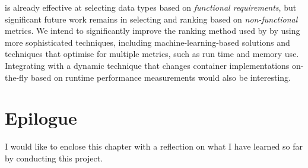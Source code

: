 \Primrose{} is already effective at selecting data types based on \emph{functional requirements}, but significant future work remains in selecting and ranking based on \emph{non-functional} metrics. 
We intend to significantly improve the ranking method used by \Primrose{} by using more sophisticated techniques, including machine-learning-based solutions and techniques that optimise for multiple metrics, such as run time and memory use.
Integrating \Primrose{} with a dynamic technique that changes container implementations on-the-fly based on runtime performance measurements would also be interesting.

\section{Epilogue}
\label{chap2:epilogue}
I would like to enclose this chapter with a reflection on what I have learned so far by conducting this project.

